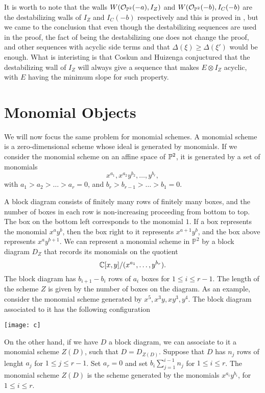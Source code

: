 \documentclass[
	oldfontcommands,
	sumario=abnt-6027-2012,
	12pt,			%
	openright,		%
	oneside,		%
	a4paper,		%
	english,		%
	brazil			%
	]{imecc-unicamp}
\begin{document}
It is worth to note that the walls $W({\mathcal O}_{{\mathbb P}^2}(-a),I_Z)$ and $W({\mathcal O}_{{\mathbb P}^2}(-b),I_C(-b)$ are the destabilizing walls of $I_Z$ and $I_C(-b)$ respectively and this is proved in \cite{COSKUN}, but we came to the conclusion that even though the destabilizing sequences are used in the proof, the fact of being the destabilizing one does not change the proof, and other sequences with acyclic side terms and that $\Delta(\xi)\geq\Delta(\xi')$ would be enough. What is interisting is that Coskun and Huizenga conjuctured that the destabilizing wall of $I_Z$ will always give a sequence that makes $E\otimes I_Z$ acyclic, with $E$ having the minimum slope for such property.

\section{Monomial Objects}

We will now focus the same problem for monomial schemes. A monomial scheme is a zero-dimensional scheme whose ideal is generated by monomials. If we consider the monomial scheme on an affine space of ${\mathbb P}^2$, it is generated by a set of monomials $$
x^{a_1},x^{a_2}y^{b_2},\dots,y^{b_r},
$$ 
with $a_1>a_2>\dots>a_r=0$, and $b_r>b_{r-1}>\dots>b_1=0$. 

A block diagram consists of finitely many rows of finitely many boxes, and the number of boxes in each row is non-increasing proceeding from bottom to top. The box on the bottom left corresponds to the monomial $1$. If a box represents the monomial $x^ay^b$, then the box right to it represents $x^{a+1}y^b$, and the box above represents $x^ay^{b+1}$. We can represent a monomial scheme in $\mathbb P^2$ by a block diagram $D_Z$ that records its monomials on the quotient $$
{\mathbb C}[x,y]/(x^{a_1},\dots,y^{b_r}).
$$ 
The block diagram has $b_{i+1}-b_i$ rows of $a_i$ boxes for $1\le i\le r-1$. The length of the scheme $Z$ is given by the number of boxes on the diagram. As an example, consider the monomial scheme generated by $x^5,x^3y,xy^3,y^4$. The block diagram associated to it has the following configuration 

\begin{center}
	{\texttt{[image: c]}}
\end{center}

On the other hand, if we have $D$ a block diagram, we can associate to it a monomial scheme $Z(D)$, such that $D=D_{Z(D)}$. Suppose that $D$ has $n_j$ rows of lenght $a_j$ for $1\le j\le r-1$. Set $a_r=0$ and set $b_i\sum^{i-1}_{j=1}n_j$ for $1\le i\le r$. The monomial scheme $Z(D)$ is the scheme generated by the monomials $x^{a_i}y^{b_i}$, for $1\le i\le r$.
\end{document}
